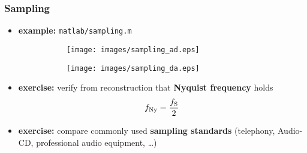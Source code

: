 \begin{frame}
	\frametitle{Sampling}
	\begin{itemize}
		\item \textbf{example:} \texttt{matlab/sampling.m}
			\begin{figure}
				\centering
				\begin{subfigure}[c]{0.48\linewidth}
					\texttt{[image: images/sampling\_ad.eps]}
				\end{subfigure}
				\hspace{0.01\linewidth}
				\begin{subfigure}[c]{0.48\linewidth}
					\texttt{[image: images/sampling\_da.eps]}
				\end{subfigure}
			\end{figure}
		\item \textbf{exercise:} verify from reconstruction that \textbf{Nyquist frequency} holds
			\begin{align*}
				f_{\textrm{Ny}}=\frac{f_{\textrm S}}2
			\end{align*}
		\item \textbf{exercise:} compare commonly used \textbf{sampling standards} (telephony, Audio-CD, professional audio equipment, \ldots)
	\end{itemize}
\end{frame}

